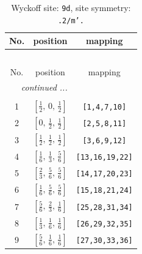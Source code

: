 \documentclass[fleqn,8pt]{jsarticle}
\begin{document}
\begin{longtable}{ccc}
\caption{Wyckoff site: {\tt 9d}, site symmetry: {\tt .2/m'.}}
 \\
 \hline \hline
No. & position & mapping \\ \hline \endfirsthead

\multicolumn{2}{l}{\tablename\ \thetable{}} \\
 \hline \hline
No. & position & mapping \\ \hline \endhead

 \hline \hline
\multicolumn{2}{r}{\footnotesize\it continued ...} \\ \endfoot

 \hline \hline
\multicolumn{2}{r}{} \\ \endlastfoot

1 & $\left[ \frac{1}{2},\, 0,\, \frac{1}{2} \right]$ & {\tt [1,4,7,10]} \\ \hline
2 & $\left[ 0,\, \frac{1}{2},\, \frac{1}{2} \right]$ & {\tt [2,5,8,11]} \\ \hline
3 & $\left[ \frac{1}{2},\, \frac{1}{2},\, \frac{1}{2} \right]$ & {\tt [3,6,9,12]} \\ \hline
4 & $\left[ \frac{1}{6},\, \frac{1}{3},\, \frac{5}{6} \right]$ & {\tt [13,16,19,22]} \\ \hline
5 & $\left[ \frac{2}{3},\, \frac{5}{6},\, \frac{5}{6} \right]$ & {\tt [14,17,20,23]} \\ \hline
6 & $\left[ \frac{1}{6},\, \frac{5}{6},\, \frac{5}{6} \right]$ & {\tt [15,18,21,24]} \\ \hline
7 & $\left[ \frac{5}{6},\, \frac{2}{3},\, \frac{1}{6} \right]$ & {\tt [25,28,31,34]} \\ \hline
8 & $\left[ \frac{1}{3},\, \frac{1}{6},\, \frac{1}{6} \right]$ & {\tt [26,29,32,35]} \\ \hline
9 & $\left[ \frac{5}{6},\, \frac{1}{6},\, \frac{1}{6} \right]$ & {\tt [27,30,33,36]} \\
\end{longtable}
\renewcommand{\arraystretch}{1.2}
\end{document}
